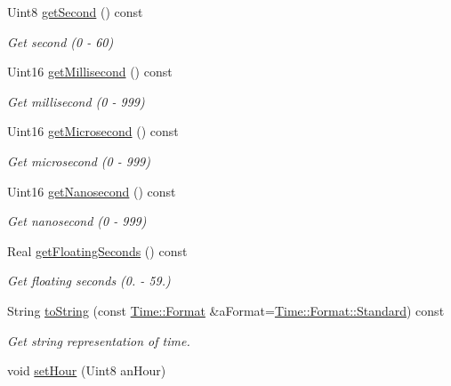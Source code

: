 \begin{DoxyCompactItemize}
Uint8 \hyperlink{classlibrary_1_1physics_1_1time_1_1_time_aca543eadd3112d54a0d014512f99e90a}{get\+Second} () const
\begin{DoxyCompactList}\small\item\em Get second (0 -\/ 60) \end{DoxyCompactList}\item 
Uint16 \hyperlink{classlibrary_1_1physics_1_1time_1_1_time_aba745cf1f96b5826e50f8a074af13369}{get\+Millisecond} () const
\begin{DoxyCompactList}\small\item\em Get millisecond (0 -\/ 999) \end{DoxyCompactList}\item 
Uint16 \hyperlink{classlibrary_1_1physics_1_1time_1_1_time_a10bc719a72442215d0f073afadc7b542}{get\+Microsecond} () const
\begin{DoxyCompactList}\small\item\em Get microsecond (0 -\/ 999) \end{DoxyCompactList}\item 
Uint16 \hyperlink{classlibrary_1_1physics_1_1time_1_1_time_a13de54324ffddc6f73e6e4ccc9149068}{get\+Nanosecond} () const
\begin{DoxyCompactList}\small\item\em Get nanosecond (0 -\/ 999) \end{DoxyCompactList}\item 
Real \hyperlink{classlibrary_1_1physics_1_1time_1_1_time_adfbd0fd8b766f43a6f3a8bdccd8852fb}{get\+Floating\+Seconds} () const
\begin{DoxyCompactList}\small\item\em Get floating seconds (0. -\/ 59.) \end{DoxyCompactList}\item 
String \hyperlink{classlibrary_1_1physics_1_1time_1_1_time_a9cd369886bade37d48146afc0d7a2271}{to\+String} (const \hyperlink{classlibrary_1_1physics_1_1time_1_1_time_a7cfbcbb1d5d0c536e28e61f1e7cbf1c8}{Time\+::\+Format} \&a\+Format=\hyperlink{classlibrary_1_1physics_1_1time_1_1_time_a7cfbcbb1d5d0c536e28e61f1e7cbf1c8aeb6d8ae6f20283755b339c0dc273988b}{Time\+::\+Format\+::\+Standard}) const
\begin{DoxyCompactList}\small\item\em Get string representation of time. \end{DoxyCompactList}\item 
void \hyperlink{classlibrary_1_1physics_1_1time_1_1_time_a7e1d98631f94f394e0360921d52b0c87}{set\+Hour} (Uint8 an\+Hour)

\end{DoxyCompactItemize}
